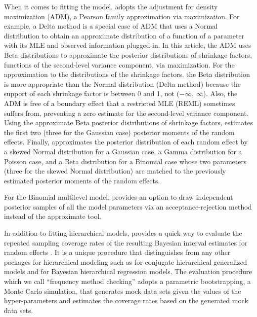 \documentclass[article]{jss}
\begin{document}
When it comes to fitting the model,  adopts the adjustment for density maximization \citep{carl1988, morris1997, tang2011} (ADM), a Pearson family approximation via maximization. For example, a Delta method is a special case of ADM that uses a Normal distribution to obtain an approximate distribution of a function of a parameter with its MLE and observed information plugged-in. In this article, the ADM uses Beta distributions to approximate the posterior distributions of shrinkage factors, functions of the second-level variance component, via maximization. For the approximation to the distributions of the shrinkage factors, the Beta distribution  is more appropriate than the Normal distribution (Delta method) because the support of each shrinkage factor is between 0 and 1, not ($-\infty,~\infty$). Also, the ADM is free of a boundary effect that a restricted MLE \citep{patterson1971recovery} (REML) sometimes suffers from, preventing a zero estimate for the second-level variance component. Using the approximate Beta posterior distributions of shrinkage factors,  estimates the first two (three for the Gaussian case) posterior moments of the random effects. Finally,  approximates the posterior distribution of each random effect by a skewed Normal distribution for a Gaussian case, a Gamma distribution for a Poisson case, and a Beta distribution for a Binomial case whose two parameters (three for the skewed Normal distribution) are matched to the previously estimated posterior moments of the random effects. 

For the Binomial  multilevel model,  provides an option to draw independent posterior samples of all the model parameters via an acceptance-rejection method instead of the approximate tool.


In addition to fitting hierarchical models,  provides a quick way to evaluate the repeated sampling coverage rates of the resulting Bayesian interval estimates for random effects \citep{morris1997, daniels1999prior, tang2002fitting, tang2011, morris2012}. It is a unique procedure that distinguishes   from any other  packages for hierarchical modeling such as  \citep{hglm2010, ronnegaard2011hglm} for conjugate hierarchical generalized models and  \citep{gelman2014arm} for Bayesian hierarchical regression models. The evaluation procedure which we call ``frequency method checking'' adopts a parametric bootstrapping, a Monte Carlo simulation, that generates mock data sets given the values of the hyper-parameters and estimates the coverage rates based on the generated mock data sets.
\end{document}
